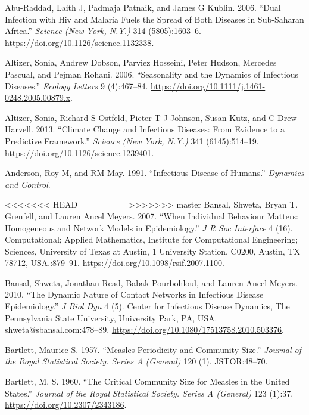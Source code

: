 \documentclass[]{book}
\theoremstyle{definition}
\theoremstyle{definition}
\theoremstyle{definition}
\theoremstyle{remark}
\begin{document}
\hypertarget{refs}{}
\leavevmode\hypertarget{ref-abu-raddad06}{}%
Abu-Raddad, Laith J, Padmaja Patnaik, and James G Kublin. 2006. ``Dual
Infection with Hiv and Malaria Fuels the Spread of Both Diseases in
Sub-Saharan Africa.'' \emph{Science (New York, N.Y.)} 314
(5805):1603--6. \url{https://doi.org/10.1126/science.1132338}.

\leavevmode\hypertarget{ref-altizer06}{}%
Altizer, Sonia, Andrew Dobson, Parviez Hosseini, Peter Hudson, Mercedes
Pascual, and Pejman Rohani. 2006. ``Seasonality and the Dynamics of
Infectious Diseases.'' \emph{Ecology Letters} 9 (4):467--84.
\url{https://doi.org/10.1111/j.1461-0248.2005.00879.x}.

\leavevmode\hypertarget{ref-altizer13}{}%
Altizer, Sonia, Richard S Ostfeld, Pieter T J Johnson, Susan Kutz, and C
Drew Harvell. 2013. ``Climate Change and Infectious Diseases: From
Evidence to a Predictive Framework.'' \emph{Science (New York, N.Y.)}
341 (6145):514--19. \url{https://doi.org/10.1126/science.1239401}.

\leavevmode\hypertarget{ref-anderson91}{}%
Anderson, Roy M, and RM May. 1991. ``Infectious Disease of Humans.''
\emph{Dynamics and Control}.

<<<<<<< HEAD
\leavevmode\hypertarget{ref-bansal07}{}%
=======
\hypertarget{ref-bansal07}{}
>>>>>>> master
Bansal, Shweta, Bryan T. Grenfell, and Lauren Ancel Meyers. 2007. ``When
Individual Behaviour Matters: Homogeneous and Network Models in
Epidemiology.'' \emph{J R Soc Interface} 4 (16). Computational; Applied
Mathematics, Institute for Computational Engineering; Sciences,
University of Texas at Austin, 1 University Station, C0200, Austin, TX
78712, USA.:879--91. \url{https://doi.org/10.1098/rsif.2007.1100}.

\leavevmode\hypertarget{ref-bansal10}{}%
Bansal, Shweta, Jonathan Read, Babak Pourbohloul, and Lauren Ancel
Meyers. 2010. ``The Dynamic Nature of Contact Networks in Infectious
Disease Epidemiology.'' \emph{J Biol Dyn} 4 (5). Center for Infectious
Disease Dynamics, The Pennsylvania State University, University Park,
PA, USA. shweta@sbansal.com:478--89.
\url{https://doi.org/10.1080/17513758.2010.503376}.

\leavevmode\hypertarget{ref-bartlett57}{}%
Bartlett, Maurice S. 1957. ``Measles Periodicity and Community Size.''
\emph{Journal of the Royal Statistical Society. Series A (General)} 120
(1). JSTOR:48--70.

\leavevmode\hypertarget{ref-bartlett60}{}%
Bartlett, M. S. 1960. ``The Critical Community Size for Measles in the
United States.'' \emph{Journal of the Royal Statistical Society. Series
A (General)} 123 (1):37. \url{https://doi.org/10.2307/2343186}.
\end{document}
